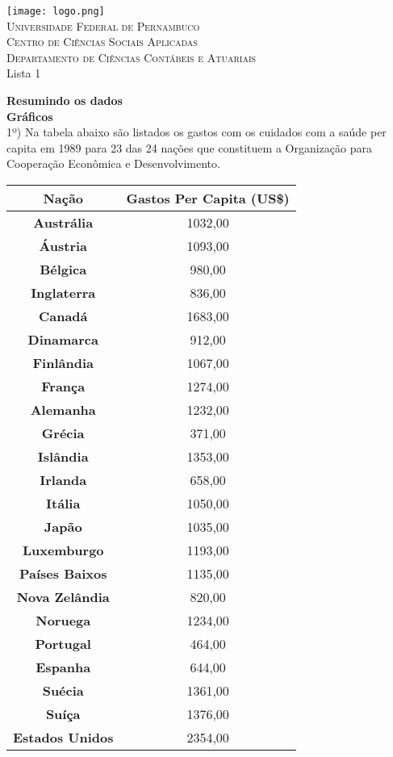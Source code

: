 \documentclass[12pt,a4paper]{article}
\begin{document}
	\begin{center}
		\texttt{[image: logo.png]}\\
		\textsc{Universidade Federal de Pernambuco\\
			Centro de Ciências Sociais Aplicadas\\
			Departamento de Ciências Contábeis e Atuariais\\}
		\vspace{5cm}
		\huge Lista 1\\ \normalsize
		\vspace{4cm}
	\end{center}
	\newpage
	\textbf{Resumindo os dados}\\
	\textbf{Gráficos}\\
	1º) Na tabela abaixo são listados os gastos com os cuidados com a saúde per capita em 1989 para 23 das 24 nações que constituem a Organização para Cooperação Econômica e Desenvolvimento.
	\begin{center}
		\begin{tabular}{|c|c|} \hline
			\textbf{Nação} & \textbf{Gastos Per Capita (US\$)}\\ \hline
			\textbf{Austrália} & 1032,00\\ \hline
			\textbf{Áustria} & 1093,00\\ \hline
			\textbf{Bélgica} & 980,00\\ \hline
			\textbf{Inglaterra} & 836,00\\ \hline
			\textbf{Canadá} & 1683,00\\ \hline
			\textbf{Dinamarca} & 912,00\\ \hline
			\textbf{Finlândia} & 1067,00\\ \hline
			\textbf{França} & 1274,00\\ \hline
			\textbf{Alemanha} & 1232,00\\ \hline
			\textbf{Grécia} & 371,00\\ \hline
			\textbf{Islândia} & 1353,00\\ \hline
			\textbf{Irlanda} & 658,00\\ \hline
			\textbf{Itália} & 1050,00\\ \hline
			\textbf{Japão} & 1035,00\\ \hline
			\textbf{Luxemburgo} & 1193,00\\ \hline
			\textbf{Países Baixos} & 1135,00\\ \hline
			\textbf{Nova Zelândia} & 820,00\\ \hline
			\textbf{Noruega} & 1234,00\\ \hline
			\textbf{Portugal} & 464,00\\ \hline
			\textbf{Espanha} & 644,00\\ \hline
			\textbf{Suécia} & 1361,00\\ \hline
			\textbf{Suíça} & 1376,00\\ \hline
			\textbf{Estados Unidos} & 2354,00\\ \hline	
		\end{tabular}
	\end{center}
\end{document}
